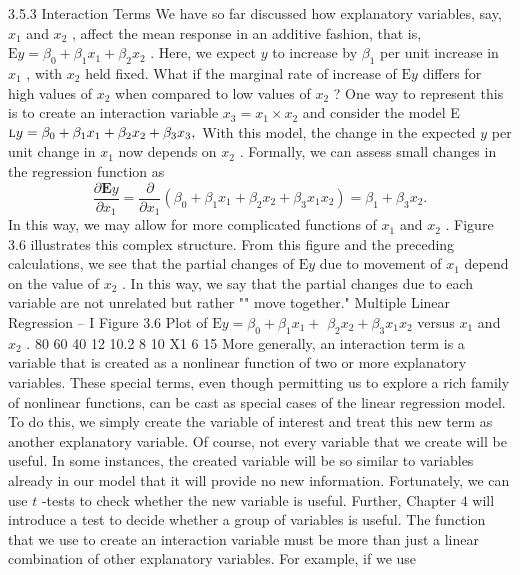 \documentclass[11pt]{article}
\begin{document}
3.5.3 Interaction Terms
We have so far discussed how explanatory variables, say, \(x_{1}\) and \(x_{2}\) , affect the
mean response in an additive fashion, that is, \(\textrm{E} y \!=\! \beta_{0}+\! \beta_{1} x_{1}+\beta_{2} x_{2}\) . Here, we
expect \(y\) to increase by \(\beta_{1}\) per unit increase in \(x_{1}\) , with \(x_{2}\) held fixed. What if the
 marginal rate of increase of \(\textrm{E} y\) differs for high values of \(x_{2}\) when compared to
low values of \(x_{2}\) ? One way to represent this is to create an interaction variable
\(x_{3}=x_{1} \times x_{2}\) and consider the model E \(\textsc{l} y=\beta_{0}+\beta_{1} x_{1}+\beta_{2} x_{2}+\beta_{3} x_{3} ,\)
With this model, the change in the expected \(y\) per unit change in \(x_{1}\) now
depends on \(x_{2}\) . Formally, we can assess small changes in the regression function
as
\[
\frac{\partial\textbf{E} y} {\partial x_{1}}=\frac{\partial} {\partial x_{1}} \left( \beta_{0}+\beta_{1} x_{1}+\beta_{2} x_{2}+\beta_{3} x_{1} x_{2} \right)=\beta_{1}+\beta_{3} x_{2} .
\]
In this way, we may allow for more complicated functions of \(x_{1}\) and \(x_{2}\) . Figure 3.6
 illustrates this complex structure. From this figure and the preceding calculations,
 we see that the partial changes of \(\textrm{E} y\) due to movement of \(x_{1}\) depend on the value
of \(x_{2}\) . In this way, we say that the partial changes due to each variable are not
unrelated but rather "" move together."
 Multiple Linear Regression -- I
Figure 3.6 Plot of
\(\textrm{E} y=\beta_{0}+\beta_{1} x_{1}+\)
\(\beta_{2} x_{2}+\beta_{3} x_{1} x_{2}\) versus
\(x_{1}\) and \(x_{2}\) .
80
 60
40 
12
10.2
8
10
X1
6
15
 More generally, an interaction term is a variable that is created as a nonlinear
function of two or more explanatory variables. These special terms, even though
 permitting us to explore a rich family of nonlinear functions, can be cast as special
cases of the linear regression model. To do this, we simply create the variable
of interest and treat this new term as another explanatory variable. Of course,
not every variable that we create will be useful. In some instances, the created
variable will be so similar to variables already in our model that it will provide
no new information. Fortunately, we can use \(t\) -tests to check whether the new
variable is useful. Further, Chapter \(4\) will introduce a test to decide whether a
 group of variables is useful.
The function that we use to create an interaction variable must be more than
 just a linear combination of other explanatory variables. For example, if we use
\end{document}
